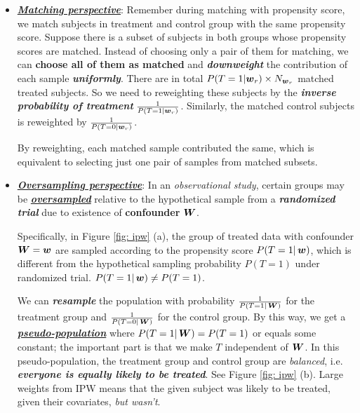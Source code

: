 \documentclass[11pt]{article}
\begin{document}
\begin{itemize}
\item \underline{\emph{\textbf{Matching perspective}}}: Remember during matching with propensity score, we match subjects in treatment and control group with the same propensity score. Suppose there is a subset of subjects  in both groups whose propensity scores are matched. Instead of choosing only a pair of them for matching, we can \textbf{choose all of them as matched} and \textbf{\emph{downweight}} the contribution of each sample \emph{\textbf{uniformly}}. There are in total $P(T=1 | \boldsymbol{w}_{r}) \times N_{\boldsymbol{w}_r}$ matched treated subjects. So we need to reweighting these subjects by the \emph{\textbf{inverse probability of treatment}} $\frac{1}{P(T=1 | \boldsymbol{w}_{r})}$. Similarly, the matched control subjects is reweighted by $\frac{1}{P(T=0 | \boldsymbol{w}_{r})}$. 

By reweighting, each matched sample contributed the same, which is equivalent to selecting just one pair of samples from matched subsets.

\item \underline{\emph{\textbf{Oversampling perspective}}}:  In an \emph{observational study}, certain groups may be \underline{\textbf{\emph{oversampled}}} relative to the hypothetical sample from a \emph{\textbf{randomized trial}} due to existence of \textbf{confounder} $\boldsymbol{W}$. 

Specifically, in Figure \ref{fig: ipw} (a), the group of treated data with confounder $\boldsymbol{W} = \boldsymbol{w}$ are sampled according to the propensity score $P(T=1|\,\boldsymbol{w})$, which is different from the hypothetical sampling probability $P(T=1)$ under randomized trial. $P(T=1|\,\boldsymbol{w}) \neq P(T=1)$.

We can \emph{\textbf{resample}} the population with probability $\frac{1}{P(T=1|\,\boldsymbol{W})}$ for the treatment group and $\frac{1}{P(T=0|\,\boldsymbol{W})}$ for the control group. By this way, we get a \underline{\emph{\textbf{pseudo-population}}} where $P(T=1|\,\boldsymbol{W}) = P(T=1)$ or equals some constant; the important part is that we make $T$ independent of $\boldsymbol{W}$. In this pseudo-population, the treatment group and control group are \emph{balanced}, i.e. \emph{\textbf{everyone is equally likely to be treated}}. See Figure \ref{fig: ipw} (b). Large weights from IPW means that the given subject was likely to be treated, given their covariates, \emph{but wasn't}.


\end{itemize}
\end{document}
